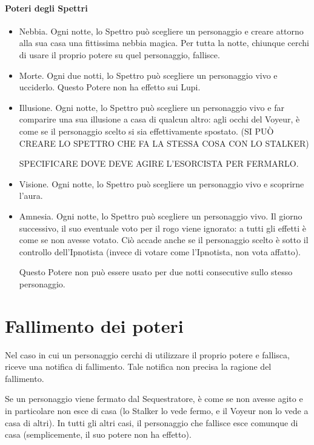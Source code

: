 \documentclass[a4paper,10pt]{article}
\begin{document}
\paragraph{Poteri degli Spettri}

\begin{itemize}
 \item Nebbia. Ogni notte, lo Spettro può scegliere un personaggio e creare attorno alla sua casa una fittissima nebbia magica. Per tutta la notte, chiunque cerchi di usare il proprio potere su quel personaggio, fallisce.
 
 \item Morte. Ogni due notti, lo Spettro può scegliere un personaggio vivo e ucciderlo. Questo Potere non ha effetto sui Lupi.
 
 \item Illusione. Ogni notte, lo Spettro può scegliere un personaggio vivo e far comparire una sua illusione a casa di qualcun altro: agli occhi del Voyeur, è come se il personaggio scelto si sia effettivamente spostato. (SI PUÒ CREARE LO SPETTRO CHE FA LA STESSA COSA CON LO STALKER)
 
 SPECIFICARE DOVE DEVE AGIRE L'ESORCISTA PER FERMARLO.
 
 \item Visione. Ogni notte, lo Spettro può scegliere un personaggio vivo e scoprirne l'aura.
 
 \item Amnesia. Ogni notte, lo Spettro può scegliere un personaggio vivo. Il giorno successivo, il suo eventuale voto per il rogo viene ignorato: a tutti gli effetti è come se non avesse votato. Ciò accade anche se il personaggio scelto è sotto il controllo dell'Ipnotista (invece di votare come l'Ipnotista, non vota affatto).
 
 Questo Potere non può essere usato per due notti consecutive sullo stesso personaggio.
\end{itemize}


\section{Fallimento dei poteri}

Nel caso in cui un personaggio cerchi di utilizzare il proprio potere e fallisca, riceve una notifica di fallimento. Tale notifica non precisa la ragione del fallimento.

Se un personaggio viene fermato dal Sequestratore, è come se non avesse agito e in particolare non esce di casa (lo Stalker lo vede fermo, e il Voyeur non lo vede a casa di altri).
In tutti gli altri casi, il personaggio che fallisce esce comunque di casa (semplicemente, il suo potere non ha effetto).
\end{document}
